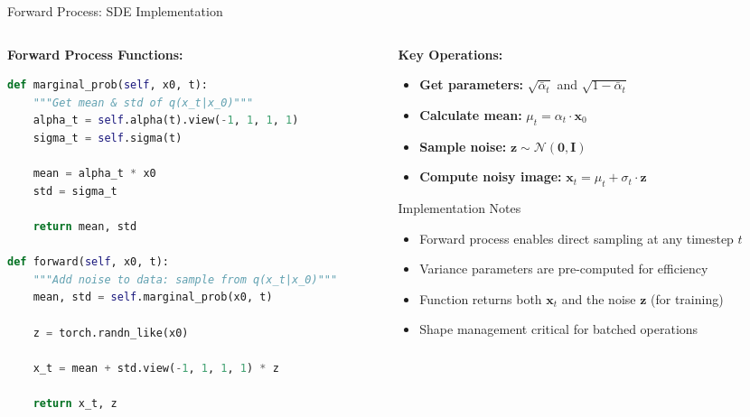 \documentclass[10pt]{beamer}
\begin{document}
\begin{frame}[fragile]{Forward Process: SDE Implementation}
  \begin{columns}[T]
    \begin{column}{0.5\textwidth}
      \textbf{Forward Process Functions:}
      \begin{lstlisting}[language=Python,
                            basicstyle=\ttfamily\tiny,
                            numbers=none,
                            frame=single]
def marginal_prob(self, x0, t):
    """Get mean & std of q(x_t|x_0)"""
    alpha_t = self.alpha(t).view(-1, 1, 1, 1)
    sigma_t = self.sigma(t)

    mean = alpha_t * x0
    std = sigma_t

    return mean, std

def forward(self, x0, t):
    """Add noise to data: sample from q(x_t|x_0)"""
    mean, std = self.marginal_prob(x0, t)

    z = torch.randn_like(x0)

    x_t = mean + std.view(-1, 1, 1, 1) * z

    return x_t, z
      \end{lstlisting}
    \end{column}

    \begin{column}{0.5\textwidth}
      \textbf{Key Operations:}
      \begin{itemize}\itemsep -0.1cm
        \item \textbf{Get parameters:} $\sqrt{\bar{\alpha}_t}$ and $\sqrt{1-\bar{\alpha}_t}$
        \item \textbf{Calculate mean:} $\mu_t = \alpha_t \cdot \mathbf{x}_0$
        \item \textbf{Sample noise:} $\mathbf{z} \sim \mathcal{N}(\mathbf{0}, \mathbf{I})$
        \item \textbf{Compute noisy image:} $\mathbf{x}_t = \mu_t + \sigma_t \cdot \mathbf{z}$
      \end{itemize}

      \vspace{0.3cm}
      \begin{alertblock}{Implementation Notes}
        \begin{itemize}\itemsep -0.1cm
          \item Forward process enables direct sampling at any timestep $t$
          \item Variance parameters are pre-computed for efficiency
          \item Function returns both $\mathbf{x}_t$ and the noise $\mathbf{z}$ (for training)
          \item Shape management critical for batched operations
        \end{itemize}
      \end{alertblock}
    \end{column}
  \end{columns}
\end{frame}
\end{document}
